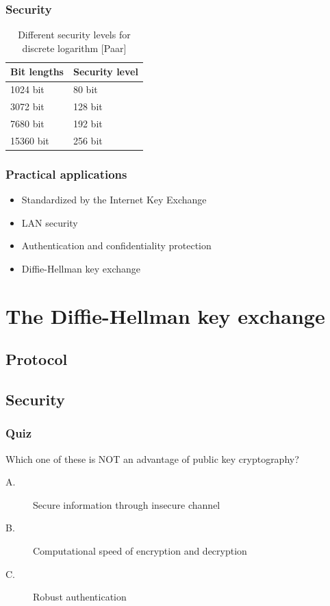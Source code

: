 \documentclass{beamer}
\begin{document}
\begin{frame}
\frametitle{Security}
\begin{table}
\begin{tabular}{l l}
\textbf{Bit lengths} & \textbf{Security level} \\
\midrule
1024 bit & 80 bit \\
3072 bit & 128 bit \\
7680 bit & 192 bit \\
15360 bit & 256 bit
\end{tabular}
\medskip
\caption{Different security levels for discrete logarithm [Paar]}
\end{table}
\end{frame}


\begin{frame}
\frametitle{Practical applications}
\begin{itemize}
    \item Standardized by the Internet Key Exchange
    \item LAN security
    \item Authentication and confidentiality protection
    \item Diffie-Hellman key exchange
\end{itemize}
\end{frame}

\section{The Diffie-Hellman key exchange}
\subsection{Protocol}
\subsection{Security}

\begin{frame}
\frametitle{Quiz}
Which one of these is NOT an advantage of public key cryptography?
\bigskip
\begin{description}
    \item[A.] Secure information through insecure channel
    \item[B.] Computational speed of encryption and decryption
    \item[C.] Robust authentication
\end{description}

\end{frame}
\end{document}

